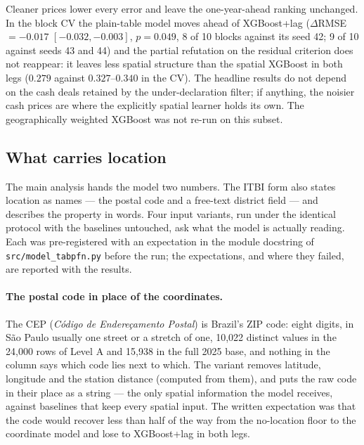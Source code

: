 \documentclass[11pt,a4paper]{article}
\begin{document}
Cleaner prices lower every error and leave the one-year-ahead ranking unchanged. In the block CV
the plain-table model moves ahead of XGBoost+lag ($\Delta$RMSE $= -0.017$
$[-0.032, -0.003]$, $p = 0.049$, 8 of 10 blocks against its seed 42; 9 of 10 against seeds 43
and 44) and the partial refutation on the residual criterion does not reappear: it leaves less
spatial structure than the spatial XGBoost in both legs ($0.279$ against $0.327$--$0.340$ in the
CV). The headline results do not depend on the cash deals retained by the under-declaration
filter; if anything, the noisier cash prices are where the explicitly spatial learner holds its
own. The geographically weighted XGBoost was not re-run on this subset.

\subsection{What carries location}
\label{sec:carriers}

The main analysis hands the model two numbers. The ITBI form also states location as names ---
the postal code and a free-text district field --- and describes the property in words. Four
input variants, run under the identical protocol with the baselines untouched, ask what the
model is actually reading. Each was pre-registered with an expectation in the module docstring
of \texttt{src/model\_tabpfn.py} before the run; the expectations, and where they failed, are
reported with the results.

\paragraph{The postal code in place of the coordinates.} The CEP (\emph{Código de Endereçamento
Postal}) is Brazil's ZIP code: eight digits, in São Paulo usually one street or a stretch of
one, 10{,}022 distinct values in the 24{,}000 rows of Level A and 15{,}938 in the full 2025
base, and nothing in the column says which code lies next to which. The variant removes
latitude, longitude and the station distance (computed from them), and puts the raw code in
their place as a string --- the only spatial information the model receives, against baselines
that keep every spatial input. The written expectation was that the code would recover less than
half of the way from the no-location floor to the coordinate model and lose to XGBoost+lag in
both legs.
\end{document}

